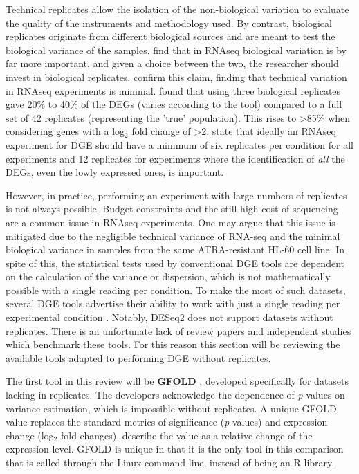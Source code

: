 Technical replicates allow the isolation of the non-biological variation to evaluate the quality of the instruments and methodology used. By contrast, biological replicates originate from different biological sources and are meant to test the biological variance of the samples. \cite{liu2014rna} find that in RNAseq biological variation is by far more important, and given a choice between the two, the researcher should invest in biological replicates. \cite{bullard2010evaluation} confirm this claim, finding that technical variation in RNAseq experiments is minimal. \cite{schurch2016many} found that using three biological replicates gave 20\% to 40\% of the \ac{DEG}s (varies according to the tool) compared to a full set of 42 replicates (representing the 'true' population). This rises to >85\% when considering genes with a log$_2$ fold change of >2. \cite{schurch2016many} state that ideally an RNAseq experiment for \ac{DGE} should have a minimum of six replicates per condition for all experiments and 12 replicates for experiments where the identification of \textit{all} the \ac{DEG}s, even the lowly expressed ones, is important. 

However, in practice, performing an experiment with large numbers of replicates is not always possible. Budget constraints and the still-high cost of sequencing are a common issue in RNAseq experiments. One may argue that this issue is mitigated due to the negligible technical variance of RNA-seq \citep{bullard2010evaluation} and the minimal biological variance in samples from the same \ac{ATRA}-resistant HL-60 cell line. In spite of this, the statistical tests used by conventional \ac{DGE} tools are dependent on the calculation of the variance or dispersion, which is not mathematically possible with a single reading per condition. To make the most of such datasets, several \ac{DGE} tools advertise their ability to work with just a single reading per experimental condition \citep{feng2012gfold, gim2016lpeseq, anders2010differential, wang2010degseq, al2014bootstrap}. Notably, DESeq2 does not support datasets without replicates. There is an unfortunate lack of review papers and independent studies which benchmark these tools. For this reason this section will be reviewing the available tools adapted to performing \ac{DGE} without replicates.

The first tool in this review will be \textbf{GFOLD} \citep{feng2012gfold}, developed specifically for datasets lacking in replicates. The developers acknowledge the dependence of \textit{p}-values on variance estimation, which is impossible without replicates. A unique GFOLD value replaces the standard metrics of significance (\textit{p}-values) and expression change (log$_2$ fold changes). \cite{feng2012gfold} describe the value as a relative change of the expression level. GFOLD is unique in that it is the only tool in this comparison that is called through the Linux command line, instead of being an R library.

